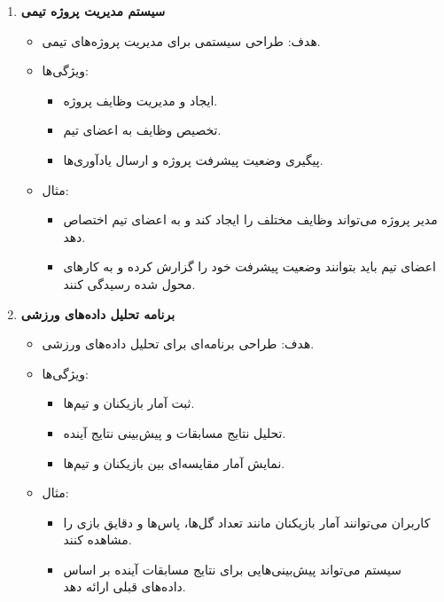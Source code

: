 \documentclass[a4paper,12pt]{article}
\begin{document}
\begin{enumerate}
			\item \textbf{سیستم مدیریت پروژه تیمی}
			\begin{itemize}
				\item هدف: طراحی سیستمی برای مدیریت پروژه‌های تیمی.
				\item ویژگی‌ها:
				\begin{itemize}
					\item ایجاد و مدیریت وظایف پروژه.
					\item تخصیص وظایف به اعضای تیم.
					\item پیگیری وضعیت پیشرفت پروژه و ارسال یادآوری‌ها.
				\end{itemize}
				\item مثال:
				\begin{itemize}
					\item مدیر پروژه می‌تواند وظایف مختلف را ایجاد کند و به اعضای تیم اختصاص دهد.
					\item اعضای تیم باید بتوانند وضعیت پیشرفت خود را گزارش کرده و به کارهای محول شده رسیدگی کنند.
				\end{itemize}
			\end{itemize}
			
			\item \textbf{برنامه تحلیل داده‌های ورزشی}
			\begin{itemize}
				\item هدف: طراحی برنامه‌ای برای تحلیل داده‌های ورزشی.
				\item ویژگی‌ها:
				\begin{itemize}
					\item ثبت آمار بازیکنان و تیم‌ها.
					\item تحلیل نتایج مسابقات و پیش‌بینی نتایج آینده.
					\item نمایش آمار مقایسه‌ای بین بازیکنان و تیم‌ها.
				\end{itemize}
				\item مثال:
				\begin{itemize}
					\item کاربران می‌توانند آمار بازیکنان مانند تعداد گل‌ها، پاس‌ها و دقایق بازی را مشاهده کنند.
					\item سیستم می‌تواند پیش‌بینی‌هایی برای نتایج مسابقات آینده بر اساس داده‌های قبلی ارائه دهد.
				\end{itemize}
			\end{itemize}
			
		\end{enumerate}
		
	
	
\end{document}
